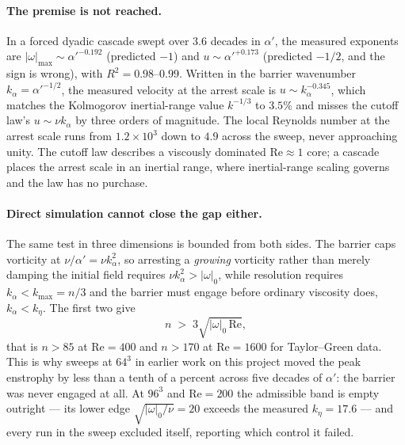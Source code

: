 \documentclass[11pt,a4paper]{article}
\begin{document}
\paragraph{The premise is not reached.} In a forced dyadic cascade swept over $3.6$ decades in
$\alpha'$, the measured exponents are $|\omega|_{\max}\sim\alpha'^{-0.192}$ (predicted $-1$) and
$u\sim\alpha'^{+0.173}$ (predicted $-1/2$, and the sign is wrong), with $R^2=0.98$--$0.99$. Written
in the barrier wavenumber $k_\alpha=\alpha'^{-1/2}$, the measured velocity at the arrest scale is
$u\sim k_\alpha^{-0.345}$, which matches the Kolmogorov inertial-range value $k^{-1/3}$ to $3.5\%$
and misses the cutoff law's $u\sim\nu k_\alpha$ by three orders of magnitude. The local Reynolds
number at the arrest scale runs from $1.2\times10^3$ down to $4.9$ across the sweep, never
approaching unity. The cutoff law describes a viscously dominated $\mathrm{Re}\approx1$ core; a
cascade places the arrest scale in an inertial range, where inertial-range scaling governs and the
law has no purchase.

\paragraph{Direct simulation cannot close the gap either.} The same test in three dimensions is
bounded from both sides. The barrier caps vorticity at $\nu/\alpha'=\nu k_\alpha^2$, so arresting a
\emph{growing} vorticity rather than merely damping the initial field requires
$\nu k_\alpha^2>|\omega|_0$, while resolution requires $k_\alpha<k_{\max}=n/3$ and the barrier must
engage before ordinary viscosity does, $k_\alpha<k_\eta$. The first two give
\begin{equation}
  n \;>\; 3\sqrt{|\omega|_0\,\mathrm{Re}},
  \label{eq:barrier-resolution}
\end{equation}
that is $n>85$ at $\mathrm{Re}=400$ and $n>170$ at $\mathrm{Re}=1600$ for Taylor--Green data. This
is why sweeps at $64^3$ in earlier work on this project moved the peak enstrophy by less than a
tenth of a percent across five decades of $\alpha'$: the barrier was never engaged at all. At
$96^3$ and $\mathrm{Re}=200$ the admissible band is empty outright --- its lower edge
$\sqrt{|\omega|_0/\nu}=20$ exceeds the measured $k_\eta=17.6$ --- and every run in the sweep
excluded itself, reporting which control it failed.
\end{document}
